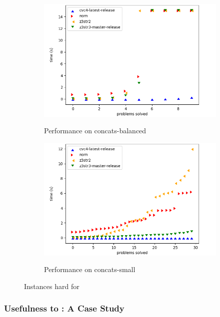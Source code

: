 \begin{figure}[h]
    \begin{subfigure}{.5\textwidth}
        \includegraphics[width=\textwidth]{data/graphs/concats-balanced.png}
        \label{fig:concats-balanced}
        \caption{Performance on concats-balanced}
    \end{subfigure}
    \begin{subfigure}{.5\textwidth}
        \includegraphics[width=\textwidth]{data/graphs/concats-small.png}
        \label{fig:concats-small}
        \caption{Performance on concats-small}
    \end{subfigure}
    \caption{Instances hard for \us{}}
    \label{fig:z3str3-hard}
\end{figure}

\subsubsection{Usefulness to \us{}: A Case Study}

